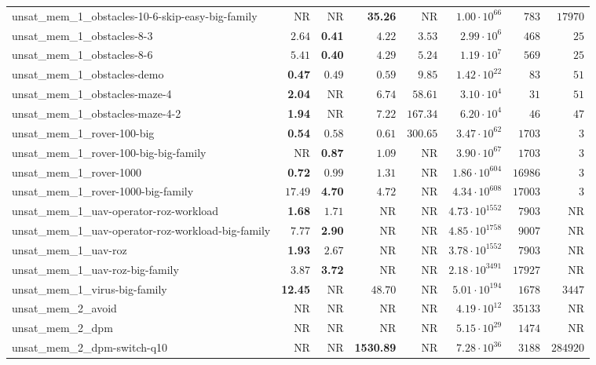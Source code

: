 \begin{tabular}{lrrrrrrr}
unsat\_mem\_1\_obstacles-10-6-skip-easy-big-family & NR & NR & \textbf{35.26} & NR & $1.00\cdot 10^{66}$ & $783$ & $17970$ \\
unsat\_mem\_1\_obstacles-8-3 & $2.64$ & \textbf{0.41} & $4.22$ & $3.53$ & $2.99\cdot 10^{6}$ & $468$ & $25$ \\
unsat\_mem\_1\_obstacles-8-6 & $5.41$ & \textbf{0.40} & $4.29$ & $5.24$ & $1.19\cdot 10^{7}$ & $569$ & $25$ \\
unsat\_mem\_1\_obstacles-demo & \textbf{0.47} & $0.49$ & $0.59$ & $9.85$ & $1.42\cdot 10^{22}$ & $83$ & $51$ \\
unsat\_mem\_1\_obstacles-maze-4 & \textbf{2.04} & NR & $6.74$ & $58.61$ & $3.10\cdot 10^{4}$ & $31$ & $51$ \\
unsat\_mem\_1\_obstacles-maze-4-2 & \textbf{1.94} & NR & $7.22$ & $167.34$ & $6.20\cdot 10^{4}$ & $46$ & $47$ \\
unsat\_mem\_1\_rover-100-big & \textbf{0.54} & $0.58$ & $0.61$ & $300.65$ & $3.47\cdot 10^{62}$ & $1703$ & $3$ \\
unsat\_mem\_1\_rover-100-big-big-family & NR & \textbf{0.87} & $1.09$ & NR & $3.90\cdot 10^{67}$ & $1703$ & $3$ \\
unsat\_mem\_1\_rover-1000 & \textbf{0.72} & $0.99$ & $1.31$ & NR & $1.86\cdot 10^{604}$ & $16986$ & $3$ \\
unsat\_mem\_1\_rover-1000-big-family & $17.49$ & \textbf{4.70} & $4.72$ & NR & $4.34\cdot 10^{608}$ & $17003$ & $3$ \\
unsat\_mem\_1\_uav-operator-roz-workload & \textbf{1.68} & $1.71$ & NR & NR & $4.73\cdot 10^{1552}$ & $7903$ & NR \\
unsat\_mem\_1\_uav-operator-roz-workload-big-family & $7.77$ & \textbf{2.90} & NR & NR & $4.85\cdot 10^{1758}$ & $9007$ & NR \\
unsat\_mem\_1\_uav-roz & \textbf{1.93} & $2.67$ & NR & NR & $3.78\cdot 10^{1552}$ & $7903$ & NR \\
unsat\_mem\_1\_uav-roz-big-family & $3.87$ & \textbf{3.72} & NR & NR & $2.18\cdot 10^{3491}$ & $17927$ & NR \\
unsat\_mem\_1\_virus-big-family & \textbf{12.45} & NR & $48.70$ & NR & $5.01\cdot 10^{194}$ & $1678$ & $3447$ \\
unsat\_mem\_2\_avoid & NR & NR & NR & NR & $4.19\cdot 10^{12}$ & $35133$ & NR \\
unsat\_mem\_2\_dpm & NR & NR & NR & NR & $5.15\cdot 10^{29}$ & $1474$ & NR \\
unsat\_mem\_2\_dpm-switch-q10 & NR & NR & \textbf{1530.89} & NR & $7.28\cdot 10^{36}$ & $3188$ & $284920$ \\

\end{tabular}
